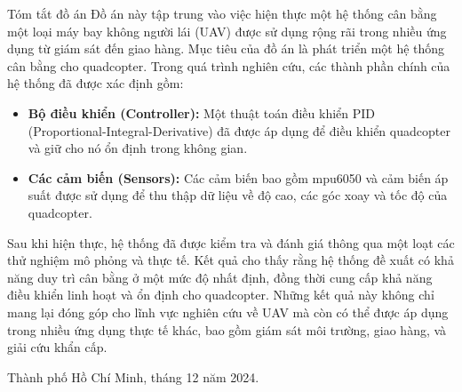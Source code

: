 \begin{preface}{Tóm tắt đồ án}
\tab Đồ án này tập trung vào việc hiện thực một hệ thống cân bằng một loại máy bay không người lái (UAV) được sử dụng rộng rãi trong nhiều ứng dụng từ giám sát đến giao hàng. Mục tiêu của đồ án là phát triển một hệ thống cân bằng cho quadcopter. Trong quá trình nghiên cứu, các thành phần chính của hệ thống đã được xác định gồm:
\begin{itemize}
    \item \textbf{Bộ điều khiển (Controller):} Một thuật toán điều khiển PID (Proportional-Integral-Derivative) đã được áp dụng để điều khiển quadcopter và giữ cho nó ổn định trong không gian.
    \item \textbf{Các cảm biến (Sensors):} Các cảm biến bao gồm mpu6050 và cảm biến áp suất được sử dụng để thu thập dữ liệu về độ cao, các góc xoay và tốc độ của quadcopter.
\end{itemize}
\tab Sau khi hiện thực, hệ thống đã được kiểm tra và đánh giá thông qua một loạt các thử nghiệm mô phỏng và thực tế. Kết quả cho thấy rằng hệ thống đề xuất có khả năng duy trì cân bằng ở một mức độ nhất định, đồng thời cung cấp khả năng điều khiển linh hoạt và ổn định cho quadcopter. Những kết quả này không chỉ mang lại đóng góp cho lĩnh vực nghiên cứu về UAV mà còn có thể được áp dụng trong nhiều ứng dụng thực tế khác, bao gồm giám sát môi trường, giao hàng, và giải cứu khẩn cấp.
\begin{flushright}
Thành phố Hồ Chí Minh, tháng 12 năm 2024.
\end{flushright}
\end{preface}